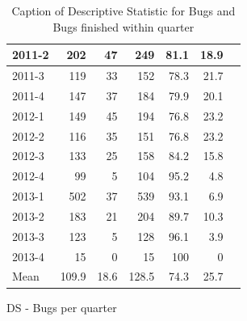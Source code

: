 \documentclass[UKenglish]{ifimaster}  %
\begin{document}
\begin{appendices}
\begin{table}[!htbp]
\begin{adjustwidth}{-1.5cm}{}
\begin{subfigure}[b]{0.4\textwidth}
{\begin{tabular}{ | l | r | r | r | r | r | r | }
2011-2 & 202 & 47 & 249 & 81.1 & 18.9 \\ \hline
2011-3 & 119 & 33 & 152 & 78.3 & 21.7 \\ \hline
2011-4 & 147 & 37 & 184 & 79.9 & 20.1 \\ \hline
2012-1 & 149 & 45 & 194 & 76.8 & 23.2 \\ \hline
2012-2 & 116 & 35 & 151 & 76.8 & 23.2 \\ \hline
2012-3 & 133 & 25 & 158 & 84.2 & 15.8 \\ \hline
2012-4 & 99 & 5 & 104 & 95.2 & 4.8 \\ \hline
2013-1 & 502 & 37 & 539 & 93.1 & 6.9 \\ \hline
2013-2 & 183 & 21 & 204 & 89.7 & 10.3 \\ \hline
2013-3 & 123 & 5 & 128 & 96.1 & 3.9 \\ \hline
2013-4 & 15 & 0 & 15 & 100 & 0 \\ \hline
Mean & 109.9&	18.6&128.5&74.3&25.7 \\ \hline

\end{tabular}
}
\caption{DS - Bugs per quarter}
 \label{DS:FTPQ:5}
\end{subfigure}
\end{adjustwidth}
\caption[Optional caption for list of figures]{Caption of Descriptive Statistic for Bugs and Bugs finished within quarter}
\label{DS:5:5} %
\end{table}



\end{appendices}
\end{document}

